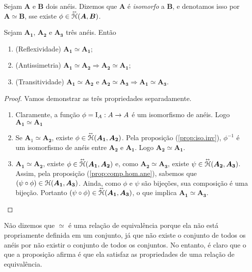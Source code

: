 \begin{definition}
	Sejam $\bm A$ e $\bm B$ dois anéis. Dizemos que $\bm A$ é \emph{isomorfo} a $\bm B$, e denotamos isso por $\bm A \simeq \bm B$, sse existe $\phi \in \accentset{\leftrightarrow}{\mathcal{H}}(\bm A,\bm B)$.
\end{definition}

\begin{proposition}
	Sejam $\bm{A_1}$, $\bm{A_2}$ e $\bm{A_3}$ três anéis. Então
	\begin{enumerate}
	\item (Reflexividade) $\bm{A_1} \simeq \bm{A_1}$;
	\item (Antissimetria) $\bm{A_1} \simeq \bm{A_2} \Rightarrow \bm{A_2} \simeq \bm{A_1}$;
	\item (Transitividade) $\bm{A_1} \simeq \bm{A_2} \text{\ e\ } \bm{A_2} \simeq \bm{A_3} \Rightarrow \bm{A_1} \simeq \bm{A_3}$.
	\end{enumerate}
\end{proposition}
\begin{proof}
	Vamos demonstrar as três propriedades separadamente.
	\begin{enumerate}
	\item Claramente, a função $\phi=\mathrm{I}_A: A \to A$ é um isomorfismo de anéis. Logo $\bm{A_1} \simeq \bm{A_1}$
	\item Se $\textbf{A}_1 \simeq \bm{A_2}$, existe $\phi \in \accentset{\leftrightarrow}{\mathcal{H}}(\bm{A_1},\bm{A_2})$. Pela proposição (\ref{prop:iso.inv}), $\phi^{-1}$ é um isomorfismo de anéis entre $\bm{A_2}$ e $\bm{A_1}$. Logo $\bm{A_2} \simeq \bm{A_1}$.
	\item $\bm{A_1} \simeq \bm{A_2}$, existe $\phi \in \accentset{\leftrightarrow}{\mathcal{H}}(\bm{A_1},\bm{A_2})$ e, como $\bm{A_2} \simeq \bm{A_3}$, existe $\psi \in \accentset{\leftrightarrow}{\mathcal{H}}(\bm{A_2},\bm{A_3})$. Assim, pela proposição (\ref{prop:comp.hom.ane}), sabemos que $(\psi \circ \phi) \in \mathcal{H}(\bm{A_1},\bm{A_3})$. Ainda, como $\phi$ e $\psi$ são bijeções, sua composição é uma bijeção. Portanto $(\psi \circ \phi) \in \accentset{\leftrightarrow}{\mathcal{H}}(\bm{A_1},\bm{A_3})$, o que implica $\bm{A_1} \simeq \bm{A_3}$.
	\end{enumerate}
\end{proof}

Não dizemos que $\simeq$ é uma relação de equivalência porque ela não está propriamente definida em um conjunto, já que não existe o conjunto de todos os anéis por não existir o conjunto de todos os conjuntos. No entanto, é claro que o que a proposição afirma é que ela satisfaz as propriedades de uma relação de equivalência.

